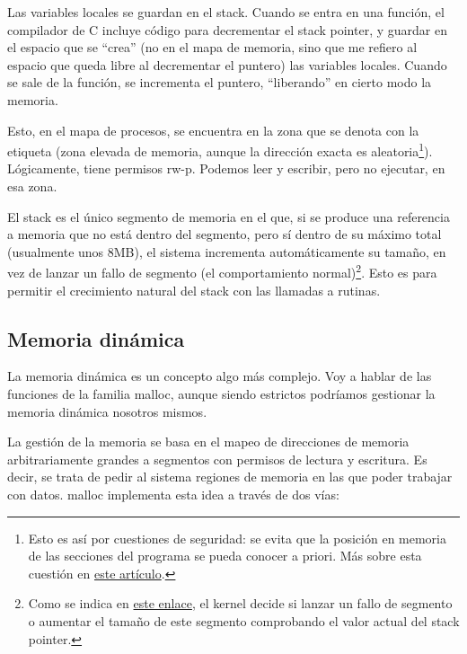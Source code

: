 \documentclass[a4paper]{article}
\begin{document}
Las variables locales se guardan en el stack. Cuando se entra en una función, el compilador de C incluye código para decrementar el stack pointer, y guardar en el espacio que se ``crea'' (no en el mapa de memoria, sino que me refiero al espacio que queda libre al decrementar el puntero) las variables locales. Cuando se sale de la función, se incrementa el puntero, ``liberando'' en cierto modo la memoria.

Esto, en el mapa de procesos, se encuentra en la zona que se denota con la etiqueta {\ttfamily [stack]} (zona elevada de memoria, aunque la dirección exacta es aleatoria\footnote{Esto es así por cuestiones de seguridad: se evita que la posición en memoria de las secciones del programa se pueda conocer a priori. Más sobre esta cuestión en \href{https://manybutfinite.com/post/anatomy-of-a-program-in-memory/}{este artículo}.}). Lógicamente, tiene permisos {\ttfamily rw-p}. Podemos leer y escribir, pero no ejecutar, en esa zona.

El stack es el único segmento de memoria en el que, si se produce una referencia a memoria que no está dentro del segmento, pero sí dentro de su máximo total (usualmente unos 8MB), el sistema incrementa automáticamente su tamaño, en vez de lanzar un fallo de segmento (el comportamiento normal)\footnote{Como se indica en \href{https://stackoverflow.com/questions/54564273/dynamic-expansion-of-the-linux-stack}{este enlace}, el kernel decide si lanzar un fallo de segmento o aumentar el tamaño de este segmento comprobando el valor actual del stack pointer.}. Esto es para permitir el crecimiento natural del {\ttfamily stack} con las llamadas a rutinas.

\subsection{Memoria dinámica}

La memoria dinámica es un concepto algo más complejo. Voy a hablar de las funciones de la familia {\ttfamily malloc}, aunque siendo estrictos podríamos gestionar la memoria dinámica nosotros mismos.

La gestión de la memoria se basa en el mapeo de direcciones de memoria arbitrariamente grandes a segmentos con permisos de lectura y escritura. Es decir, se trata de pedir al sistema regiones de memoria en las que poder trabajar con datos. {\ttfamily malloc} implementa esta idea a través de dos vías:
\end{document}

